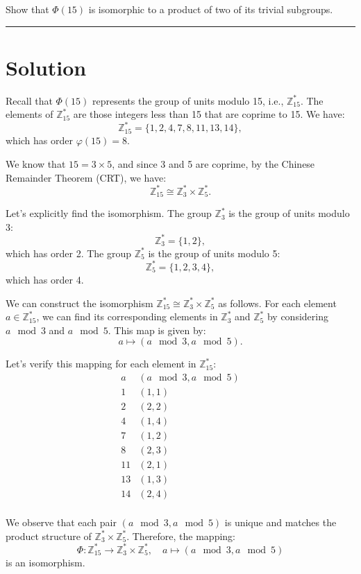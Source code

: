 \documentclass[12pt]{amsart}
\theoremstyle{definition}
\numberwithin{equation}{section}
\newcommand{\Z}{\mathbb{Z}}
\begin{document}
\begin{exercise}{3} Show that \(\Phi(15)\) is isomorphic to a product of two of its trivial subgroups.

    \noindent\rule{\linewidth}{1pt}

    \section*{Solution}

    Recall that \(\Phi(15)\) represents the group of units modulo 15, i.e., \(\Z_{15}^*\). The elements of \(\Z_{15}^*\) are those integers less than 15 that are coprime to 15. We have:
    \[
    \Z_{15}^* = \{1, 2, 4, 7, 8, 11, 13, 14\},
    \]
    which has order \(\varphi(15) = 8\).

    We know that \(15 = 3 \times 5\), and since 3 and 5 are coprime, by the Chinese Remainder Theorem (CRT), we have:
    \[
    \Z_{15}^* \cong \Z_3^* \times \Z_5^*.
    \]

    Let's explicitly find the isomorphism. The group \(\Z_3^*\) is the group of units modulo 3:
    \[
    \Z_3^* = \{1, 2\},
    \]
    which has order 2. The group \(\Z_5^*\) is the group of units modulo 5:
    \[
    \Z_5^* = \{1, 2, 3, 4\},
    \]
    which has order 4.

    We can construct the isomorphism \(\Z_{15}^* \cong \Z_3^* \times \Z_5^*\) as follows. For each element \(a \in \Z_{15}^*\), we can find its corresponding elements in \(\Z_3^*\) and \(\Z_5^*\) by considering \(a \mod 3\) and \(a \mod 5\). This map is given by:
    \[
    a \mapsto (a \mod 3, a \mod 5).
    \]

    Let's verify this mapping for each element in \(\Z_{15}^*\):
    \[
    \begin{array}{c|c}
    a & (a \mod 3, a \mod 5) \\
    \hline
    1 & (1, 1) \\
    2 & (2, 2) \\
    4 & (1, 4) \\
    7 & (1, 2) \\
    8 & (2, 3) \\
    11 & (2, 1) \\
    13 & (1, 3) \\
    14 & (2, 4) \\
    \end{array}
    \]

    We observe that each pair \((a \mod 3, a \mod 5)\) is unique and matches the product structure of \(\Z_3^* \times \Z_5^*\). Therefore, the mapping:
    \[
    \Phi: \Z_{15}^* \rightarrow \Z_3^* \times \Z_5^*, \quad a \mapsto (a \mod 3, a \mod 5)
    \]
    is an isomorphism.


\end{exercise}
\end{document}
